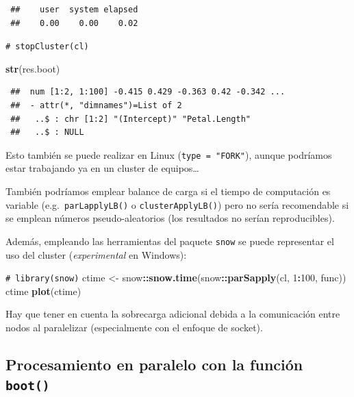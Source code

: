 \documentclass[
  spanish,
  10pt,
]{book}
\newenvironment{Shaded}{\begin{snugshade}}{\end{snugshade}}
\newcommand{\CommentTok}[1]{\textcolor[rgb]{0.56,0.35,0.01}{\textit{#1}}}
\newcommand{\DecValTok}[1]{\textcolor[rgb]{0.00,0.00,0.81}{#1}}
\newcommand{\FunctionTok}[1]{\textcolor[rgb]{0.13,0.29,0.53}{\textbf{#1}}}
\newcommand{\NormalTok}[1]{#1}
\newcommand{\OtherTok}[1]{\textcolor[rgb]{0.56,0.35,0.01}{#1}}
\newcommand{\SpecialCharTok}[1]{\textcolor[rgb]{0.81,0.36,0.00}{\textbf{#1}}}
\theoremstyle{break}
\theoremstyle{nonumberplain}
\renewcommand{\CommentTok}[1]{\textcolor[rgb]{0.41,0.41,0.41}{\texttt{#1}}}
\begin{document}
\begin{verbatim}
 ##    user  system elapsed 
 ##    0.00    0.00    0.02
\end{verbatim}

\begin{Shaded}
\begin{Highlighting}[]
\CommentTok{\# stopCluster(cl)}

\FunctionTok{str}\NormalTok{(res.boot)}
\end{Highlighting}
\end{Shaded}

\begin{verbatim}
 ##  num [1:2, 1:100] -0.415 0.429 -0.363 0.42 -0.342 ...
 ##  - attr(*, "dimnames")=List of 2
 ##   ..$ : chr [1:2] "(Intercept)" "Petal.Length"
 ##   ..$ : NULL
\end{verbatim}

Esto también se puede realizar en Linux (\texttt{type\ =\ "FORK"}), aunque podríamos estar trabajando ya en un cluster de equipos\ldots{}

También podríamos emplear balance de carga si el tiempo de computación es variable (e.g.~\texttt{parLapplyLB()} o \texttt{clusterApplyLB()}) pero no sería recomendable si se emplean números pseudo-aleatorios (los resultados no serían reproducibles).

Además, empleando las herramientas del paquete \texttt{snow} se puede representar el uso del cluster (\emph{experimental} en Windows):

\begin{Shaded}
\begin{Highlighting}[]
\CommentTok{\# library(snow)}
\NormalTok{ctime }\OtherTok{\textless{}{-}}\NormalTok{ snow}\SpecialCharTok{::}\FunctionTok{snow.time}\NormalTok{(snow}\SpecialCharTok{::}\FunctionTok{parSapply}\NormalTok{(cl, }\DecValTok{1}\SpecialCharTok{:}\DecValTok{100}\NormalTok{, func))}
\NormalTok{ctime}
\FunctionTok{plot}\NormalTok{(ctime)}
\end{Highlighting}
\end{Shaded}

Hay que tener en cuenta la sobrecarga adicional debida a la comunicación entre nodos al paralelizar (especialmente con el enfoque de socket).

\subsection{\texorpdfstring{Procesamiento en paralelo con la función \texttt{boot()}}{Procesamiento en paralelo con la función boot()}}\label{procesamiento-en-paralelo-con-la-funciuxf3n-boot}
\end{document}
